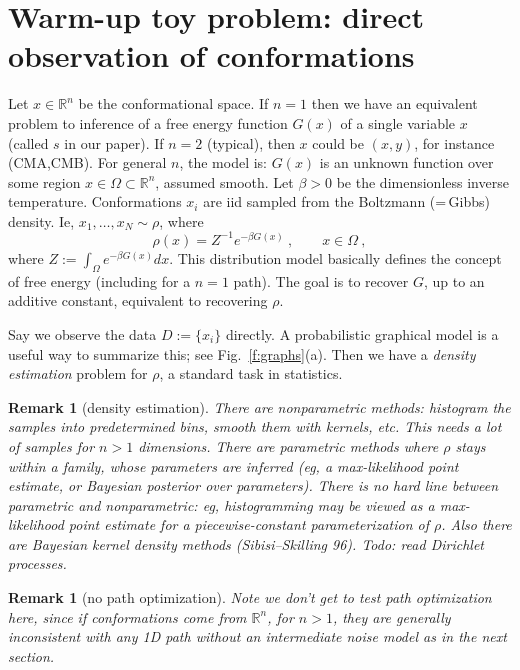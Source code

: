 \documentclass[10pt]{article}
\newcommand{\be}{\begin{equation}}
\newcommand{\ee}{\end{equation}}
\newcommand{\R}{\mathbb{R}}
\newtheorem{rmk}[thm]{Remark}
\newcommand{\bt}{\beta}
\begin{document}
\section{Warm-up toy problem: direct observation of conformations}

Let $x\in\R^n$ be the conformational space.
If $n=1$ then we have an equivalent problem to inference of a
free energy function $G(x)$ of a single variable $x$ (called $s$ in our
paper).
If $n=2$ (typical), then $x$ could be $(x,y)$, for instance (CMA,CMB).
For general $n$, the model is: $G(x)$ is an unknown function over
some region $x\in\Omega \subset \R^n$, assumed smooth.
Let $\bt>0$ be the dimensionless inverse temperature.
Conformations $x_i$ are iid sampled from the
Boltzmann (=\,Gibbs) density. Ie, $x_1,\dots, x_N \sim \rho$, where
\be
\rho(x) = Z^{-1} e^{-\bt G(x)}~, \qquad x\in\Omega~,
\label{boltz}
\ee
where $Z := \int_\Omega e^{-\bt G(x)} dx$.
This distribution model basically defines the concept of free energy
(including for a $n=1$ path).
The goal is to recover $G$, up to an additive constant,
equivalent to recovering $\rho$.

Say we observe the data $D := \{x_i\}$ directly.
A probabilistic graphical model is a useful way to summarize this;
see Fig.~\ref{f:graphs}(a).
Then we have a {\em density estimation} problem for $\rho$,
a standard task in statistics.

\begin{rmk}[density estimation]
There are nonparametric methods: histogram the samples into predetermined bins,
smooth them with kernels, etc.
This needs a lot of samples for $n>1$ dimensions.
There are parametric methods where $\rho$ stays within
a family, whose parameters are inferred (eg, a max-likelihood
point estimate, or Bayesian posterior over parameters).
There is no hard line between parametric and nonparametric:
eg, histogramming may be viewed as a max-likelihood point estimate
for a piecewise-constant parameterization of $\rho$.
Also there are Bayesian kernel density methods (Sibisi--Skilling 96).
Todo: read Dirichlet processes.
\end{rmk}

\begin{rmk}[no path optimization]
Note we don't get to test path optimization here, since if conformations
come from $\R^n$, for $n>1$, they are generally inconsistent with any 1D path
without an intermediate noise model as in the next section.
\end{rmk}
\end{document}
